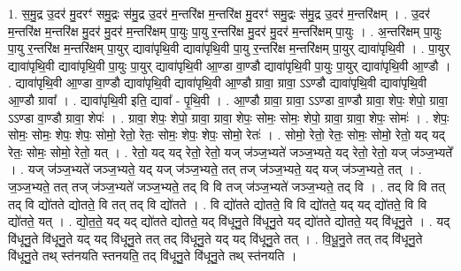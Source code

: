 \documentclass[17pt]{extarticle}
\begin{document}
1. स॒मु॒द्र उ॒दर॑ मु॒दरꣳ॑ समु॒द्रः स॑मु॒द्र उ॒दर॑ म॒न्तरि॑क्ष म॒न्तरि॑क्ष मु॒दरꣳ॑ समु॒द्रः स॑मु॒द्र उ॒दर॑ म॒न्तरि॑क्षम् । . उ॒दर॑ म॒न्तरि॑क्ष म॒न्तरि॑क्ष मु॒दर॑ मु॒दर॑ म॒न्तरि॑क्षम् पा॒युः पा॒यु र॒न्तरि॑क्ष मु॒दर॑ मु॒दर॑ म॒न्तरि॑क्षम् पा॒युः । . अ॒न्तरि॑क्षम् पा॒युः पा॒यु र॒न्तरि॑क्ष म॒न्तरि॑क्षम् पा॒युर् द्यावा॑पृथि॒वी द्यावा॑पृथि॒वी पा॒यु र॒न्तरि॑क्ष म॒न्तरि॑क्षम् पा॒युर् द्यावा॑पृथि॒वी । . पा॒युर् द्यावा॑पृथि॒वी द्यावा॑पृथि॒वी पा॒युः पा॒युर् द्यावा॑पृथि॒वी आ॒ण्डा वा॒ण्डौ द्यावा॑पृथि॒वी पा॒युः पा॒युर् द्यावा॑पृथि॒वी आ॒ण्डौ । . द्यावा॑पृथि॒वी आ॒ण्डा वा॒ण्डौ द्यावा॑पृथि॒वी द्यावा॑पृथि॒वी आ॒ण्डौ ग्रावा॒ ग्रावा॒ ऽऽण्डौ द्यावा॑पृथि॒वी द्यावा॑पृथि॒वी आ॒ण्डौ ग्रावा᳚ । . द्यावा॑पृथि॒वी इति॒ द्यावा᳚ - पृ॒थि॒वी । . आ॒ण्डौ ग्रावा॒ ग्रावा॒ ऽऽण्डा वा॒ण्डौ ग्रावा॒ शेपः॒ शेपो॒ ग्रावा॒ ऽऽण्डा वा॒ण्डौ ग्रावा॒ शेपः॑ । . ग्रावा॒ शेपः॒ शेपो॒ ग्रावा॒ ग्रावा॒ शेपः॒ सोमः॒ सोमः॒ शेपो॒ ग्रावा॒ ग्रावा॒ शेपः॒ सोमः॑ । . शेपः॒ सोमः॒ सोमः॒ शेपः॒ शेपः॒ सोमो॒ रेतो॒ रेतः॒ सोमः॒ शेपः॒ शेपः॒ सोमो॒ रेतः॑ । . सोमो॒ रेतो॒ रेतः॒ सोमः॒ सोमो॒ रेतो॒ यद् यद् रेतः॒ सोमः॒ सोमो॒ रेतो॒ यत् । . रेतो॒ यद् यद् रेतो॒ रेतो॒ यज् ज॑ञ्ज॒भ्यते॑ जञ्ज॒भ्यते॒ यद् रेतो॒ रेतो॒ यज् ज॑ञ्ज॒भ्यते᳚ । . यज् ज॑ञ्ज॒भ्यते॑ जञ्ज॒भ्यते॒ यद् यज् ज॑ञ्ज॒भ्यते॒ तत् तज् ज॑ञ्ज॒भ्यते॒ यद् यज् ज॑ञ्ज॒भ्यते॒ तत् । . ज॒ञ्ज॒भ्यते॒ तत् तज् ज॑ञ्ज॒भ्यते॑ जञ्ज॒भ्यते॒ तद् वि वि तज् ज॑ञ्ज॒भ्यते॑ जञ्ज॒भ्यते॒ तद् वि । . तद् वि वि तत् तद् वि द्यो॑तते द्योतते॒ वि तत् तद् वि द्यो॑तते । . वि द्यो॑तते द्योतते॒ वि वि द्यो॑तते॒ यद् यद् द्यो॑तते॒ वि वि द्यो॑तते॒ यत् । . द्यो॒त॒ते॒ यद् यद् द्यो॑तते द्योतते॒ यद् वि॑धूनु॒ते वि॑धूनु॒ते यद् द्यो॑तते द्योतते॒ यद् वि॑धूनु॒ते । . यद् वि॑धूनु॒ते वि॑धूनु॒ते यद् यद् वि॑धूनु॒ते तत् तद् वि॑धूनु॒ते यद् यद् वि॑धूनु॒ते तत् । . वि॒धू॒नु॒ते तत् तद् वि॑धूनु॒ते वि॑धूनु॒ते तथ् स्त॑नयति स्तनयति॒ तद् वि॑धूनु॒ते वि॑धूनु॒ते तथ् स्त॑नयति । \newline
\end{document}
